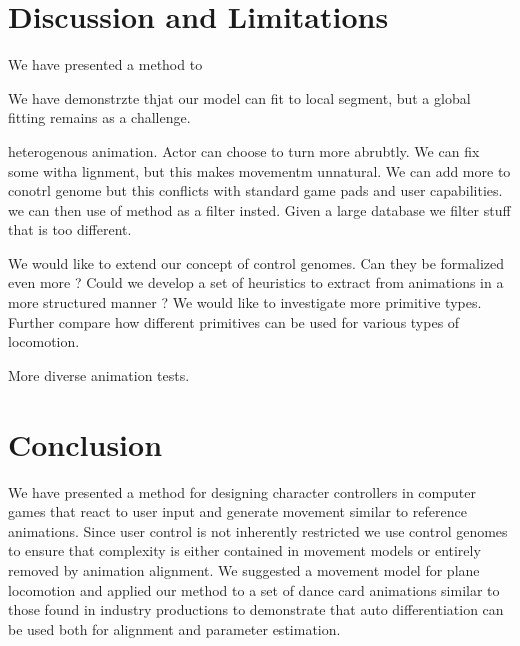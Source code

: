 \section{Discussion and Limitations}
We have presented a method to 

We have demonstrzte thjat our model can fit to local segment, but a global fitting remains as a challenge.

heterogenous animation. Actor can choose to turn more abrubtly. We can fix some witha lignment, but this makes movementm unnatural. We can add more to conotrl genome but this conflicts with standard game pads and user capabilities. we can then use of method as a filter insted. Given a large database we filter stuff that is too different.


We would like to extend our concept of control genomes. Can they be formalized even more ? Could we develop a set of heuristics to extract from animations in a more structured manner ? 
We would like to investigate more primitive types. Further compare how different primitives can be used for various types of locomotion.

More diverse animation tests.

\section{Conclusion}
We have presented a method for designing character controllers in computer games that react to user input and generate movement similar to reference animations. Since user control is not inherently restricted we use control genomes to ensure that complexity is either contained in movement models or entirely removed by animation alignment. We suggested a movement model for plane locomotion and applied our method to a set of dance card animations similar to those found in industry productions to demonstrate that auto differentiation can be used both for alignment and parameter estimation.  



